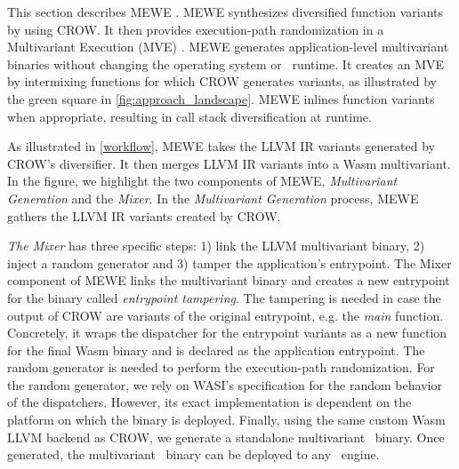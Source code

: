 
\label{section:mewe}

\renewcommand{\tool}{MEWE\xspace}
This section describes MEWE \cite{MEWE}. 
\tool synthesizes diversified function variants by using CROW.
It then provides execution-path randomization in a Multivariant Execution (MVE) \cite{bhatkar03}.
MEWE generates application-level multivariant binaries without changing the operating system or \wasm\ runtime.
It creates an MVE by intermixing functions for which CROW generates variants, as illustrated by the green square in \autoref{fig:approach_landscape}.
\tool inlines function variants when appropriate, resulting in call stack diversification at runtime.



As illustrated in \autoref{workflow}, MEWE takes the LLVM IR variants generated by CROW's diversifier. 
It then merges LLVM IR variants into a Wasm multivariant.
In the figure, we highlight the two components of MEWE, \emph{Multivariant Generation} and the \emph{Mixer}.
In the \emph{Multivariant Generation} process, 
MEWE gathers the LLVM IR variants created by CROW.

\emph{The Mixer} has three specific steps: 1) link the LLVM multivariant binary, 2) inject a random generator and 3) tamper the application's entrypoint.
The Mixer component of MEWE  links the multivariant binary and creates a new entrypoint for the binary called \emph{entrypoint tampering}.
The tampering is needed in case the output of CROW are variants of the original entrypoint, e.g. the \emph{main} function.
Concretely, it wraps the dispatcher for the entrypoint variants as a new function for the final Wasm binary and is declared as the application entrypoint.
The random generator is needed to perform the execution-path randomization.
For the random generator, we rely on WASI's specification \cite{WASI} for the random behavior of the dispatchers. 
However, its exact implementation is dependent on the platform on which the binary is deployed. 
Finally, using the same custom Wasm LLVM backend as CROW, we generate a standalone multivariant \wasm\ binary.
Once generated, the multivariant \wasm\ binary can be deployed to any \wasm\ engine. 

